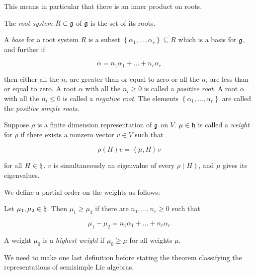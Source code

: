 This means in particular that there is an inner product on roots. 

The \emph{root system} $R \subset \mathfrak{g}$ of $\mathfrak{g}$ is the set of its roots. 

\begin{defn}
A \emph{base} for a root system $R$ is a subset $\left\{ \alpha_1, \ldots,
\alpha_r \right\} \subseteq R$ which is a basis for $\mathfrak{g}$, and further if 

\begin{equation}
\alpha = n_1 \alpha_1 + \ldots + n_r \alpha_r
\end{equation}

then either all the $n_i$ are greater than or equal to zero or all the $n_i$
are less than or equal to zero. A root $\alpha$ with all the $n_i \geq 0$ is
called a \emph{positive root}. A root $\alpha$ with all the $n_i \leq 0$ is
called a \emph{negative root}. The elements $\left\{ \alpha_1, \ldots, \alpha_r
\right\}$ are called the \emph{positive simple roots}.
\end{defn}

Suppose $\rho$ is a finite dimension representation of $\mathfrak{g}$ on $V$. $\mu \in \mathfrak{h}$ is called a \emph{weight} for $\rho$ if there exists a nonzero vector $v \in V$ such that 

\begin{equation}
\rho(H)v = \left<\mu, H\right> v
\end{equation}

for all $H \in \mathfrak{h}$. $v$ is simultaneously an eigenvalue of every $\rho(H)$,
and $\mu$ gives its eigenvalues.

We define a partial order on the weights as follows:

\begin{defn}
Let $\mu_1, \mu_2 \in \mathfrak{h}$. Then $\mu_1 \geq \mu_2$ if there are $n_1, \ldots, n_r \geq 0$ such that 

\begin{equation}
\mu_1 - \mu_2 = n_1 \alpha_1 + \ldots + n_r \alpha_r
\end{equation}

A weight $\mu_0$ is a \emph{highest weight} if $\mu_0 \geq \mu$ for all weights $\mu$.

\end{defn}

We need to make one last definition before stating the theorem classifying the representations of semisimple Lie algebras.

